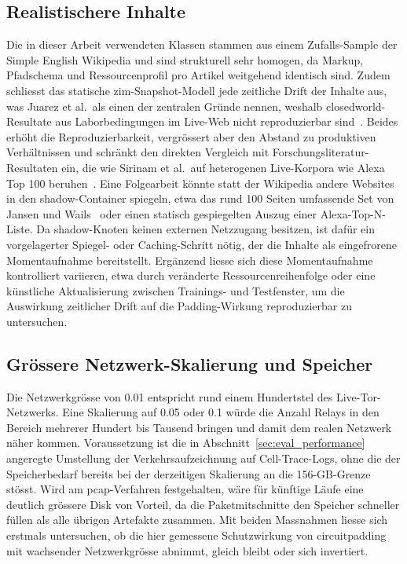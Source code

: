 \subsection{Realistischere Inhalte}
\label{sec:ausblick_inhalte}

Die in dieser Arbeit verwendeten Klassen stammen aus einem Zufalls-Sample der Simple English Wikipedia und sind strukturell sehr homogen, da Markup, Pfadschema und Ressourcenprofil pro Artikel weitgehend identisch sind.
Zudem schliesst das statische \gls{zim}-Snapshot-Modell jede zeitliche Drift der Inhalte aus, was Juarez et al.\ als einen der zentralen Gründe nennen, weshalb \gls{closedworld}-Resultate aus Laborbedingungen im Live-Web nicht reproduzierbar sind~\cite{juarez2014critical}.
Beides erhöht die Reproduzierbarkeit, vergrössert aber den Abstand zu produktiven Verhältnissen und schränkt den direkten Vergleich mit Forschungsliteratur-Resultaten ein, die wie Sirinam et al.\ auf heterogenen Live-Korpora wie Alexa Top 100 beruhen~\cite{sirinam2018deep}.
Eine Folgearbeit könnte statt der Wikipedia andere Websites in den \gls{shadow}-Container spiegeln, etwa das rund 100 Seiten umfassende Set von Jansen und Wails~\cite{jansen2023data} oder einen statisch gespiegelten Auszug einer Alexa-Top-N-Liste.
Da \gls{shadow}-Knoten keinen externen Netzzugang besitzen, ist dafür ein vorgelagerter Spiegel- oder Caching-Schritt nötig, der die Inhalte als eingefrorene Momentaufnahme bereitstellt.
Ergänzend liesse sich diese Momentaufnahme kontrolliert variieren, etwa durch veränderte Ressourcenreihenfolge oder eine künstliche Aktualisierung zwischen Trainings- und Testfenster, um die Auswirkung zeitlicher Drift auf die Padding-Wirkung reproduzierbar zu untersuchen.

\subsection{Grössere Netzwerk-Skalierung und Speicher}
\label{sec:ausblick_scale}

Die Netzwerkgrösse von 0.01 entspricht rund einem Hundertstel des Live-Tor-Netzwerks.
Eine Skalierung auf 0.05 oder 0.1 würde die Anzahl Relays in den Bereich mehrerer Hundert bis Tausend bringen und damit dem realen Netzwerk näher kommen.
Voraussetzung ist die in Abschnitt~\ref{sec:eval_performance} angeregte Umstellung der Verkehrsaufzeichnung auf Cell-Trace-Logs, ohne die der Speicherbedarf bereits bei der derzeitigen Skalierung an die 156-GB-Grenze stösst.
Wird am \gls{pcap}-Verfahren festgehalten, wäre für künftige Läufe eine deutlich grössere Disk von Vorteil, da die Paketmitschnitte den Speicher schneller füllen als alle übrigen Artefakte zusammen.
Mit beiden Massnahmen liesse sich erstmals untersuchen, ob die hier gemessene Schutzwirkung von \gls{circuitpadding} mit wachsender Netzwerkgrösse abnimmt, gleich bleibt oder sich invertiert.

